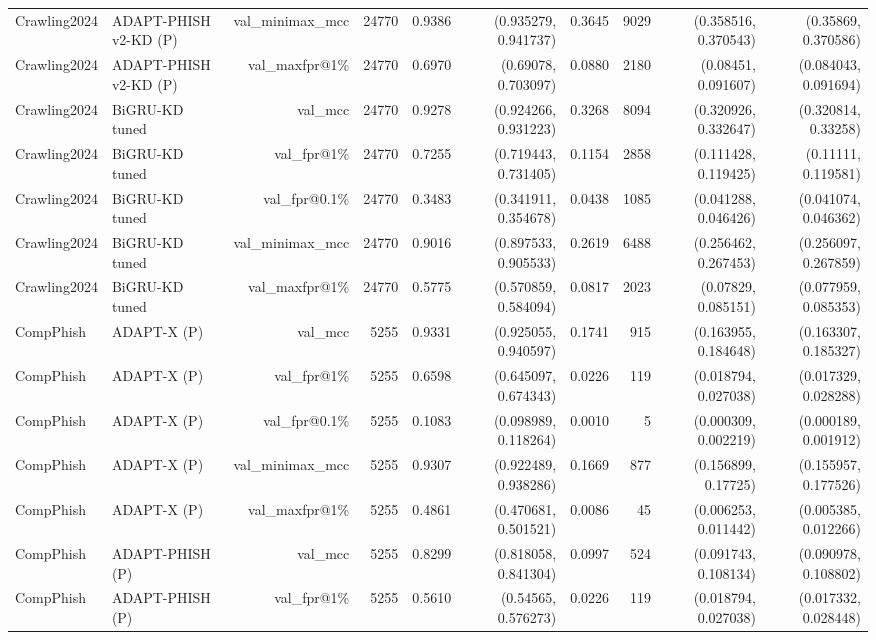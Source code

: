 \begin{table}[t]
\begin{tabular}{llrrrrrrrr}
Crawling2024 & ADAPT-PHISH v2-KD (P) & val\_minimax\_mcc & 24770 & 0.9386 & (0.935279, 0.941737) & 0.3645 & 9029 & (0.358516, 0.370543) & (0.35869, 0.370586) \\
Crawling2024 & ADAPT-PHISH v2-KD (P) & val\_maxfpr@1\% & 24770 & 0.6970 & (0.69078, 0.703097) & 0.0880 & 2180 & (0.08451, 0.091607) & (0.084043, 0.091694) \\
Crawling2024 & BiGRU-KD tuned & val\_mcc & 24770 & 0.9278 & (0.924266, 0.931223) & 0.3268 & 8094 & (0.320926, 0.332647) & (0.320814, 0.33258) \\
Crawling2024 & BiGRU-KD tuned & val\_fpr@1\% & 24770 & 0.7255 & (0.719443, 0.731405) & 0.1154 & 2858 & (0.111428, 0.119425) & (0.11111, 0.119581) \\
Crawling2024 & BiGRU-KD tuned & val\_fpr@0.1\% & 24770 & 0.3483 & (0.341911, 0.354678) & 0.0438 & 1085 & (0.041288, 0.046426) & (0.041074, 0.046362) \\
Crawling2024 & BiGRU-KD tuned & val\_minimax\_mcc & 24770 & 0.9016 & (0.897533, 0.905533) & 0.2619 & 6488 & (0.256462, 0.267453) & (0.256097, 0.267859) \\
Crawling2024 & BiGRU-KD tuned & val\_maxfpr@1\% & 24770 & 0.5775 & (0.570859, 0.584094) & 0.0817 & 2023 & (0.07829, 0.085151) & (0.077959, 0.085353) \\
CompPhish & ADAPT-X (P) & val\_mcc & 5255 & 0.9331 & (0.925055, 0.940597) & 0.1741 & 915 & (0.163955, 0.184648) & (0.163307, 0.185327) \\
CompPhish & ADAPT-X (P) & val\_fpr@1\% & 5255 & 0.6598 & (0.645097, 0.674343) & 0.0226 & 119 & (0.018794, 0.027038) & (0.017329, 0.028288) \\
CompPhish & ADAPT-X (P) & val\_fpr@0.1\% & 5255 & 0.1083 & (0.098989, 0.118264) & 0.0010 & 5 & (0.000309, 0.002219) & (0.000189, 0.001912) \\
CompPhish & ADAPT-X (P) & val\_minimax\_mcc & 5255 & 0.9307 & (0.922489, 0.938286) & 0.1669 & 877 & (0.156899, 0.17725) & (0.155957, 0.177526) \\
CompPhish & ADAPT-X (P) & val\_maxfpr@1\% & 5255 & 0.4861 & (0.470681, 0.501521) & 0.0086 & 45 & (0.006253, 0.011442) & (0.005385, 0.012266) \\
CompPhish & ADAPT-PHISH (P) & val\_mcc & 5255 & 0.8299 & (0.818058, 0.841304) & 0.0997 & 524 & (0.091743, 0.108134) & (0.090978, 0.108802) \\
CompPhish & ADAPT-PHISH (P) & val\_fpr@1\% & 5255 & 0.5610 & (0.54565, 0.576273) & 0.0226 & 119 & (0.018794, 0.027038) & (0.017332, 0.028448) \\

\end{tabular}
\end{table}
